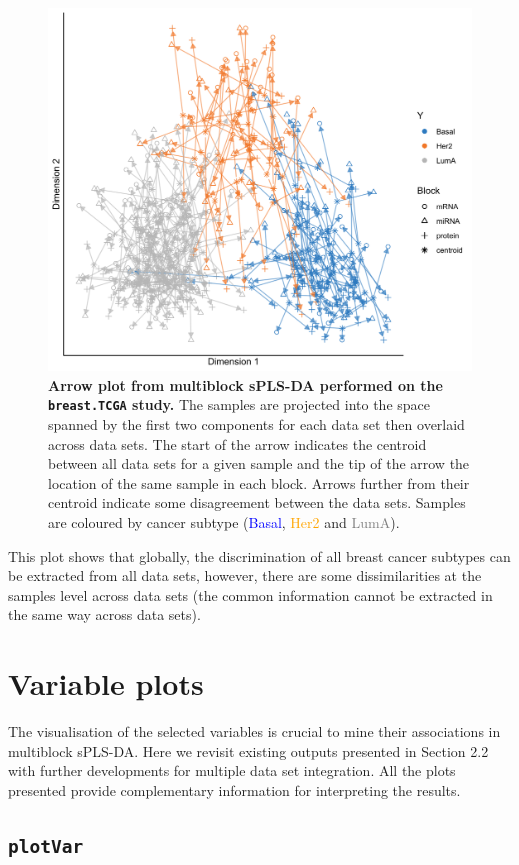 \documentclass[]{book}
\begin{document}
\begin{figure}

{\centering \includegraphics[width=0.5\linewidth]{Figures/DIABLO/diablo-plotarrow-1} 

}

\caption{\textbf{Arrow plot from multiblock sPLS-DA performed on the \texttt{breast.TCGA} study.} The samples are projected into the space spanned by the first two components for each data set then overlaid across data sets. The start of the arrow indicates the centroid between all data sets for a given sample and the tip of the arrow the location of the same sample in each block. Arrows further from their centroid indicate some disagreement between the data sets. Samples are coloured by cancer subtype (\textcolor{blue}{Basal}, \textcolor{orange}{Her2} and \textcolor{grey}{LumA}).}\label{fig:diablo-plotarrow}
\end{figure}



This plot shows that globally, the discrimination of all breast cancer subtypes can be extracted from all data sets, however, there are some dissimilarities at the samples level across data sets (the common information cannot be extracted in the same way across data sets).

\hypertarget{diablo:result:varplot}{%
\section{Variable plots}\label{diablo:result:varplot}}

The visualisation of the selected variables is crucial to mine their associations in multiblock sPLS-DA. Here we revisit existing outputs presented in Section 2.2 with further developments for multiple data set integration. All the plots presented provide complementary information for interpreting the results.

\hypertarget{plotvar}{%
\subsection{\texorpdfstring{\texttt{plotVar}}{plotVar}}\label{plotvar}}
\end{document}
